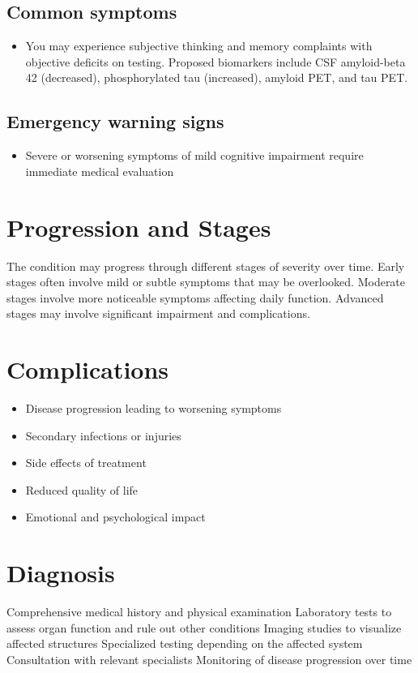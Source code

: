 \subsection{Common symptoms}
\begin{itemize}[noitemsep]
  \item You may experience subjective thinking and memory complaints with objective deficits on testing. Proposed biomarkers include CSF amyloid-beta 42 (decreased), phosphorylated tau (increased), amyloid PET, and tau PET. 
  \end{itemize}
\subsection{Emergency warning signs}
\begin{itemize}[noitemsep]
  \item Severe or worsening symptoms of mild cognitive impairment require immediate medical evaluation
\end{itemize}
\section{Progression and Stages}
The condition may progress through different stages of severity over time. Early stages often involve mild or subtle symptoms that may be overlooked. Moderate stages involve more noticeable symptoms affecting daily function. Advanced stages may involve significant impairment and complications.
\section{Complications}
\begin{itemize}[noitemsep]
  \item Disease progression leading to worsening symptoms
  \item Secondary infections or injuries
  \item Side effects of treatment
  \item Reduced quality of life
  \item Emotional and psychological impact
\end{itemize}
\section{Diagnosis}
Comprehensive medical history and physical examination Laboratory tests to assess organ function and rule out other conditions Imaging studies to visualize affected structures Specialized testing depending on the affected system Consultation with relevant specialists Monitoring of disease progression over time

